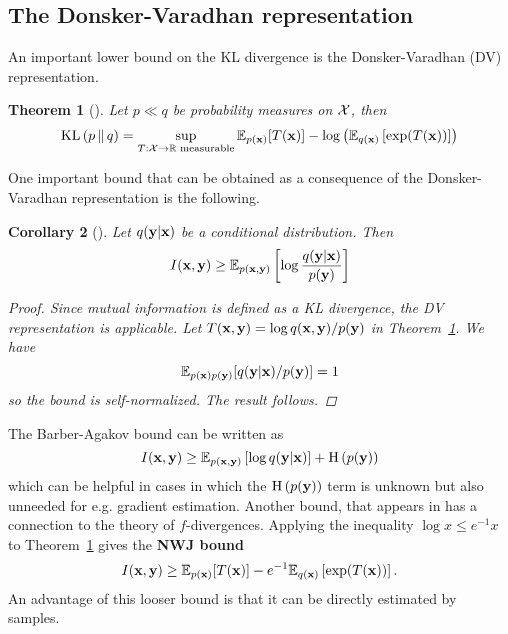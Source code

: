 \documentclass[a4paper, 10pt]{report}
\theoremstyle{plain}
\newtheorem{theorem}{Theorem}[chapter]
\newtheorem{corollary}[theorem]{Corollary}
\begin{document}
	\subsection{The Donsker-Varadhan representation}
	An important lower bound on the KL divergence is the Donsker-Varadhan (DV) representation.
	\begin{theorem}[\citet{donsker1975asymptotic}]
		\label{thm:dv}
		Let $p \ll q$ be probability measures on ${\mathcal{X}}$, then
		\begin{equation}
		\mathrm{KL}\left(p\,\|\,q\right) = \sup_{T:{\mathcal{X}}\to\mathbb{R} \textup{ measurable}} \mathbb{E}_{p({\mathbf{x}})}[T({\mathbf{x}})] - \log\left(\mathbb{E}_{q({\mathbf{x}})} \left[\exp(T({\mathbf{x}}))\right] \right)
		\end{equation}
	\end{theorem}
	One important bound that can be obtained as a consequence of the Donsker-Varadhan representation is the following.
	\begin{corollary}[\citet{ba}]
		Let $q({\mathbf{y}}|{\mathbf{x}})$ be a conditional distribution. Then
		\begin{equation}
		I({\mathbf{x}},{\mathbf{y}}) \ge \mathbb{E}_{p({\mathbf{x}},{\mathbf{y}})}\left[\log \frac{q({\mathbf{y}}|{\mathbf{x}})}{p({\mathbf{y}})}\right]
		\end{equation}
		\begin{proof}
			Since mutual information is defined as a KL divergence, the DV representation is applicable.
			Let $T({\mathbf{x}},{\mathbf{y}}) = \log q({\mathbf{x}},{\mathbf{y}})/p({\mathbf{y}})$ in Theorem~\ref{thm:dv}. We have
			\begin{equation}
			\mathbb{E}_{p({\mathbf{x}})p({\mathbf{y}})}[{q({\mathbf{y}}|{\mathbf{x}})}/{p({\mathbf{y}})}] = 1
			\end{equation}
			so the bound is \emph{self-normalized}. The result follows.
		\end{proof}
	\end{corollary}
	The Barber-Agakov bound can be written as
	\begin{equation}
	I({\mathbf{x}},{\mathbf{y}}) \ge \mathbb{E}_{p({\mathbf{x}},{\mathbf{y}})}\left[\log {q({\mathbf{y}}|{\mathbf{x}})}\right] + \textrm{H}\left(p({\mathbf{y}})\right)
	\end{equation}
	which can be helpful in cases in which the $\textrm{H}\left(p({\mathbf{y}})\right)$ term is unknown but also unneeded for e.g. gradient estimation.
	Another bound, that appears in \citet{nguyen2010estimating,nowozin2016f,mine} has a connection to the theory of $f$-divergences. Applying the inequality $\log x  \le e^{-1}x$ to Theorem~\ref{thm:dv} gives the \textbf{NWJ bound}
	\begin{equation}
	I({\mathbf{x}},{\mathbf{y}}) \ge \mathbb{E}_{p({\mathbf{x}})}[T({\mathbf{x}})] -e^{-1}\mathbb{E}_{q({\mathbf{x}})} \left[\exp(T({\mathbf{x}}))\right].
	\end{equation}
	An advantage of this looser bound is that it can be directly estimated by samples.
	
\end{document}
